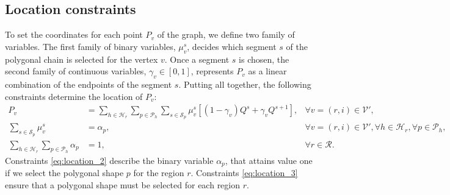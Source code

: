 \documentclass[12pt]{elsarticle}
\begin{document}
\subsection{Location constraints}
To set the coordinates for each point $P_v$ of the graph, we define two family of variables. The first family of binary variables, $\mu_v^s$, decides which segment $s$ of the polygonal chain is selected for the vertex $v$. Once a segment $s$ is chosen, the second family of continuous variables, $\gamma_v\in [0,1]$, represents $P_v$ as a linear combination of the endpoints of the segment $s$. Putting all together, the following constraints determine the location of $P_v$:
\begin{align*}
    P_v&=\sum_{h\in\mathcal H_r}\sum_{p\in\mathcal P_h} \sum_{s\in\mathcal S_p}\mu_{v}^s\left[(1-\gamma_v)Q^s+\gamma_v Q^{s+1}\right],&\forall v=(r,i)\in\mathcal V',\label{eq:location_1}\tag{$Loc-C_1$}\\
    \sum_{s\in\mathcal S_p}\mu_{v}^s&=\alpha_{p},&\forall v=(r,i)\in\mathcal V', \forall h \in \mathcal H_{r},\forall p\in\mathcal P_h,\label{eq:location_2}\tag{$Loc-C_2$}\\
    \sum_{h\in\mathcal H_r}\sum_{p\in\mathcal P_{h}} \alpha_{p}&=1,&\forall r \in\mathcal R.\label{eq:location_3}\tag{$Loc-C_3$}
\end{align*}
Constraints \eqref{eq:location_2} describe the binary variable $\alpha_{p}$, that attains value one if we select the polygonal shape $p$ for the region $r$. Constraints \eqref{eq:location_3} ensure that a polygonal shape must be selected for each region $r$.
\end{document}
